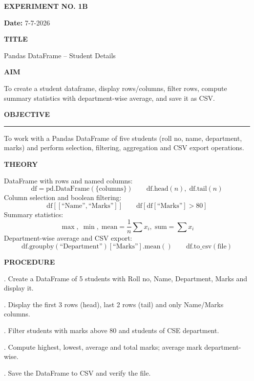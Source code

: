 \documentclass[11pt,twoside]{article}
\newcommand{\expheading}[1]{{\fontsize{14}{17}\selectfont\textbf{#1}\par}}
\newcommand{\fullrule}{\noindent\rule{\textwidth}{0.6pt}\par}
\begin{document}
{\setlength{\parskip}{1pt}\setlength{\abovedisplayskip}{2pt}\setlength{\belowdisplayskip}{2pt}
\begin{center}
\expheading{EXPERIMENT NO. 1B}
\end{center}
\vspace{2pt}

\noindent\textbf{Date:} 7-7-2026\par
\vspace{6pt}

\expheading{TITLE}
\vspace{4pt}
\noindent Pandas DataFrame -- Student Details\par
\vspace{4pt}

\expheading{AIM}
\vspace{4pt}
\noindent To create a student dataframe, display rows/columns, filter rows, compute summary statistics with department-wise average, and save it as CSV. \par
\vspace{4pt}

\expheading{OBJECTIVE}
\vspace{2pt}
\fullrule
\vspace{4pt}
\noindent To work with a Pandas DataFrame of five students (roll no, name, department, marks) and perform selection, filtering, aggregation and CSV export operations. \par
\vspace{4pt}

\expheading{THEORY}
\vspace{4pt}
DataFrame with rows and named columns:
\[\text{df}=\text{pd.DataFrame}(\{\text{columns}\})\qquad\text{df.head}(n),\; \text{df.tail}(n)\]
Column selection and boolean filtering:
\[\text{df}[[\text{``Name''},\text{``Marks''}]]\qquad \text{df}[\text{df}[\text{``Marks''}]>80]\]
Summary statistics:
\[\max,\; \min,\; \text{mean}=\frac{1}{n}\sum x_i,\; \text{sum}=\sum x_i\]
Department-wise average and CSV export:
\[\text{df.groupby}(\text{``Department''})[\text{``Marks''}].\text{mean}()\qquad \text{df.to\_csv}(\text{file})\]
\vspace{4pt}

\expheading{PROCEDURE}
\vspace{4pt}
. Create a DataFrame of 5 students with Roll no, Name, Department, Marks and display it.\par
{}. Display the first 3 rows (head), last 2 rows (tail) and only Name/Marks columns.\par
{}. Filter students with marks above 80 and students of CSE department.\par
{}. Compute highest, lowest, average and total marks; average mark department-wise.\par
{}. Save the DataFrame to CSV and verify the file. \par
\vspace{4pt}

}
\end{document}
